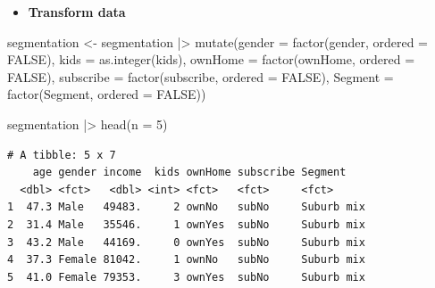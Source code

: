 \documentclass[
  ignorenonframetext,
]{beamer}
\newenvironment{Shaded}{\begin{snugshade}}{\end{snugshade}}
\newcommand{\AttributeTok}[1]{\textcolor[rgb]{0.40,0.45,0.13}{#1}}
\newcommand{\ConstantTok}[1]{\textcolor[rgb]{0.56,0.35,0.01}{#1}}
\newcommand{\DecValTok}[1]{\textcolor[rgb]{0.68,0.00,0.00}{#1}}
\newcommand{\FunctionTok}[1]{\textcolor[rgb]{0.28,0.35,0.67}{#1}}
\newcommand{\NormalTok}[1]{\textcolor[rgb]{0.00,0.23,0.31}{#1}}
\newcommand{\OtherTok}[1]{\textcolor[rgb]{0.00,0.23,0.31}{#1}}
\newcommand{\SpecialCharTok}[1]{\textcolor[rgb]{0.37,0.37,0.37}{#1}}
\providecommand{\tightlist}{%
  \setlength{\itemsep}{0pt}\setlength{\parskip}{0pt}}\usepackage{longtable,booktabs,array}
\begin{document}
\begin{frame}[fragile]{}
\label{section-5}
\begin{itemize}
\tightlist
\item
  \textbf{Transform data}
\end{itemize}

\tiny

\begin{Shaded}
\begin{Highlighting}[]
\NormalTok{segmentation }\OtherTok{\textless{}{-}}\NormalTok{ segmentation }\SpecialCharTok{|\textgreater{}}
  \FunctionTok{mutate}\NormalTok{(}\AttributeTok{gender =} \FunctionTok{factor}\NormalTok{(gender, }\AttributeTok{ordered =} \ConstantTok{FALSE}\NormalTok{),}
         \AttributeTok{kids =} \FunctionTok{as.integer}\NormalTok{(kids),}
         \AttributeTok{ownHome =} \FunctionTok{factor}\NormalTok{(ownHome, }\AttributeTok{ordered =} \ConstantTok{FALSE}\NormalTok{),}
         \AttributeTok{subscribe =} \FunctionTok{factor}\NormalTok{(subscribe, }\AttributeTok{ordered =} \ConstantTok{FALSE}\NormalTok{),}
         \AttributeTok{Segment =} \FunctionTok{factor}\NormalTok{(Segment, }\AttributeTok{ordered =} \ConstantTok{FALSE}\NormalTok{))}

\NormalTok{segmentation }\SpecialCharTok{|\textgreater{}} \FunctionTok{head}\NormalTok{(}\AttributeTok{n =} \DecValTok{5}\NormalTok{)}
\end{Highlighting}
\end{Shaded}

\begin{verbatim}
# A tibble: 5 x 7
    age gender income  kids ownHome subscribe Segment   
  <dbl> <fct>   <dbl> <int> <fct>   <fct>     <fct>     
1  47.3 Male   49483.     2 ownNo   subNo     Suburb mix
2  31.4 Male   35546.     1 ownYes  subNo     Suburb mix
3  43.2 Male   44169.     0 ownYes  subNo     Suburb mix
4  37.3 Female 81042.     1 ownNo   subNo     Suburb mix
5  41.0 Female 79353.     3 ownYes  subNo     Suburb mix
\end{verbatim}
\end{frame}
\end{document}
